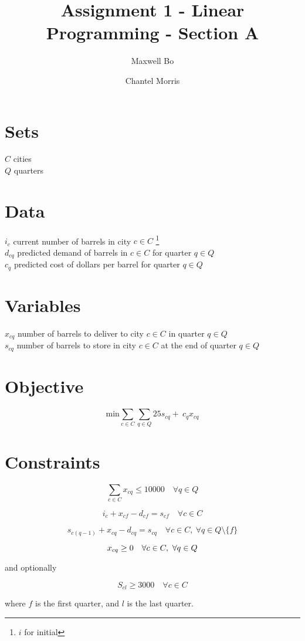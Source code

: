 \documentclass[a4paper]{article}
\title{Assignment 1 - Linear Programming - Section A}
\author{Maxwell Bo  \and Chantel Morris}
\begin{document}
 

\maketitle

\section*{Sets}

$C$ cities\\
$Q$ quarters\\

\section*{Data}

$i_c$ current number of barrels in city $c \in C$ \footnote{$i$ for initial}\\
$d_{cq}$ predicted demand of barrels in $c \in C$ for quarter $q \in Q$\\
$c_q$ predicted cost of dollars per barrel for quarter $q \in Q$\\

\section*{Variables}

$x_{cq}$ number of barrels to deliver to city $c \in C$ in quarter $q \in Q$\\
$s_{cq}$ number of barrels to store in city $c \in C$ at the end of quarter $q \in Q$\\

\section*{Objective}

\[
\text{min} \sum_{c \in C}\sum_{q \in Q} 25 s_{cq} +\: c_q x_{cq}
\]

\section*{Constraints}

\[
\sum_{c \in C} x_{cq} \leq 10000 \quad \forall q \in Q
\]

\[
i_{c} +  x_{cf} - d_{cf} = s_{cf} \quad \forall c \in C
\]

\[
s_{c(q - 1)} +  x_{cq} - d_{cq} = s_{cq} \quad \forall c \in C,\  \forall q \in Q \setminus \{ f \}
\]

\[
x_{cq} \geq 0 \quad \forall c \in C,\  \forall q \in Q\\
\]


and optionally

\[
    S_{cl} \geq 3000 \quad \forall c \in C
\]

where $f$ is the first quarter, and $l$ is the last quarter. 
\end{document}
